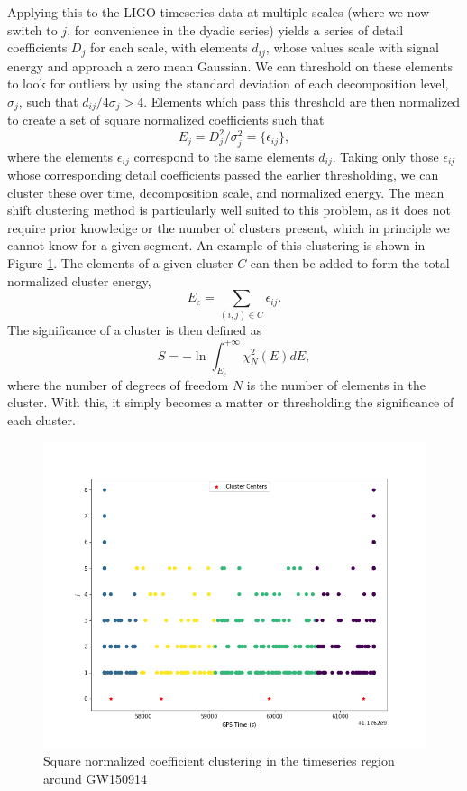 \documentclass{article}
\begin{document}
Applying this to the LIGO timeseries data at multiple scales (where we now switch to $j$, for convenience in the dyadic series) yields a series of detail coefficients $D_{j}$ for each scale, with elements $d_{ij}$, whose values scale with signal energy and approach a zero mean Gaussian\citep{Blackburn2007}. We can threshold on these elements to look for outliers by using the standard deviation of each decomposition level, $\sigma_{j}$, such that $d_{ij}/4\sigma_{j} > 4$. Elements which pass this threshold are then normalized to create a set of square normalized coefficients such that
\begin{equation}
E_{j} = D_{j}^{2}/\sigma_{j}^{2} = \{\epsilon_{ij}\},
\end{equation}
where the elements $\epsilon_{ij}$ correspond to the same elements $d_{ij}$. Taking only those $\epsilon_{ij}$ whose corresponding detail coefficients passed the earlier thresholding, we can cluster these over time, decomposition scale, and normalized energy. The mean shift clustering method is particularly well suited to this problem, as it does not require prior knowledge or the number of clusters present\citep{Ivezic2014}, which in principle we cannot know for a given segment. An example of this clustering is shown in Figure \ref{fig:cluster}. The elements of a given cluster $C$ can then be added to form the total normalized cluster energy\citep{Blackburn2007},
\begin{equation}
E_{c} = \sum_{(i,j)\in C}\epsilon_{ij}. \label{eq:Ec}
\end{equation}
The significance of a cluster is then defined as\citep{Blackburn2007}
\begin{equation}
S=-\ln\int_{E_{c}}^{+\infty}\chi_{N}^{2}(E)dE, \label{eq:significance}
\end{equation}
where the number of degrees of freedom $N$ is the number of elements in the cluster. With this, it simply becomes a matter or thresholding the significance of each cluster.

\begin{figure}
\includegraphics[width=\textwidth]{GW150914_cluster.png}
\caption{Square normalized coefficient clustering in the timeseries region around GW150914}
\label{fig:cluster}
\end{figure}
\end{document}
